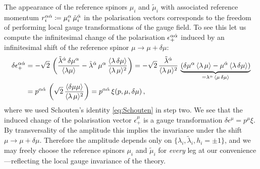 The appearance of the reference spinors $\mu_{i}$ and $\tilde\mu_{i}$ with associated
reference momentum $r_{i}^{\alpha{\dot{\alpha}}} \coloneqq  \mu_{i}^{\alpha}\, \tilde\mu_{i}^{{\dot{\alpha}}}$ in the 
polarisation vectors corresponds 
to the freedom of performing local gauge transformations of the gauge field. To see this let us  compute the infinitesimal change
of the polarisation $\epsilon_{+}^{\alpha{\dot{\alpha}}}$ induced by an infinitesimal shift of the reference
spinor $\mu\to\mu+ \delta\mu$:
\begin{align}
\label{gtargument}
\delta \epsilon_{+}^{\alpha{\dot{\alpha}}} &= - \sqrt{2}\, \left( \frac{\tilde\lambda^{{\dot{\alpha}}}\, \delta\mu^{\alpha}}{\langle\lambda\mu\rangle}
-\tilde\lambda^{{\dot{\alpha}}}\,\mu^{\alpha}\, \frac{\langle\lambda\, \delta\mu\rangle}{\langle\lambda\, \mu\rangle^{2}} \right) =
-\sqrt{2}\, \frac{\tilde\lambda^{{\dot{\alpha}}}}{\langle\lambda\, \mu\rangle^{2}}\, \underbrace{(\delta\mu^{\alpha}\, \langle\lambda\, \mu\rangle -
\mu^{{\dot{\alpha}}}\, \langle\lambda\, \delta\mu\rangle )}_{=\lambda^{\alpha}\, \langle\mu\, \delta\mu\rangle} \nonumber\\
&= p^{\alpha{\dot{\alpha}}}\, \left(\sqrt{2}\, \frac{\langle \delta\mu \mu\rangle}{\langle\lambda\, \mu\rangle^{2}}  \right)
= p^{\alpha{\dot{\alpha}}}\,\xi(p,\mu,\delta\mu)\, ,
\end{align}
where we used Schouten's identity \eqref{eq:Schouten} in step two. We see that the induced
change of the
polarisation vector  $\epsilon_{+}^{\mu}$
is a gauge transformation $\delta \epsilon^{\mu}= p^{\mu}\xi$.
By transversality of the amplitude this implies the invariance under the shift $\mu\to\mu+ \delta\mu$. Therefore the amplitude depends only on $\{\lambda_{i}, \tilde\lambda_{i}, h_{i}=\pm 1\}$,
and we may freely choose the reference spinors $\mu_{i}$ and $\tilde\mu_{i}$ for \emph{every}
leg at our convenience---reflecting the local gauge invariance of the theory.

